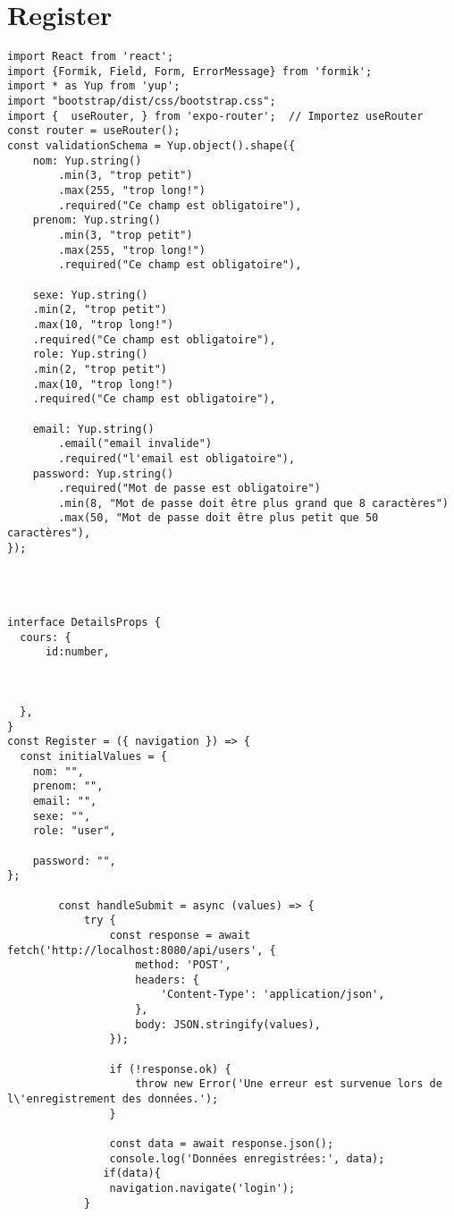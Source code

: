 \documentclass[10pt,a4paper]{article}
\begin{document}
\section{Register}
\begin{verbatim}
import React from 'react';
import {Formik, Field, Form, ErrorMessage} from 'formik';
import * as Yup from 'yup';
import "bootstrap/dist/css/bootstrap.css";
import {  useRouter, } from 'expo-router';  // Importez useRouter
const router = useRouter();
const validationSchema = Yup.object().shape({
    nom: Yup.string()
        .min(3, "trop petit")
        .max(255, "trop long!")
        .required("Ce champ est obligatoire"),
    prenom: Yup.string()
        .min(3, "trop petit")
        .max(255, "trop long!")
        .required("Ce champ est obligatoire"),
   
    sexe: Yup.string()
    .min(2, "trop petit")
    .max(10, "trop long!")
    .required("Ce champ est obligatoire"),
    role: Yup.string()
    .min(2, "trop petit")
    .max(10, "trop long!")
    .required("Ce champ est obligatoire"),
 
    email: Yup.string()
        .email("email invalide")
        .required("l'email est obligatoire"),
    password: Yup.string()
        .required("Mot de passe est obligatoire")
        .min(8, "Mot de passe doit être plus grand que 8 caractères")
        .max(50, "Mot de passe doit être plus petit que 50 caractères"),
});




interface DetailsProps {
  cours: {
      id:number,

     
  
  },
}
const Register = ({ navigation }) => {
  const initialValues = {
    nom: "",
    prenom: "",
    email: "",
    sexe: "",
    role: "user",

    password: "",
};

        const handleSubmit = async (values) => {
            try {
                const response = await fetch('http://localhost:8080/api/users', {
                    method: 'POST',
                    headers: {
                        'Content-Type': 'application/json',
                    },
                    body: JSON.stringify(values),
                });

                if (!response.ok) {
                    throw new Error('Une erreur est survenue lors de l\'enregistrement des données.');
                }

                const data = await response.json();
                console.log('Données enregistrées:', data);
               if(data){
                navigation.navigate('login');
            }
               

\end{verbatim}
\end{document}
